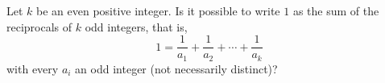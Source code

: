 Let $k$ be an even positive integer. Is it possible to write $1$ as the sum of the reciprocals of $k$ odd integers, that is,
\[1=\dfrac1{a_1}+\dfrac1{a_2}+\cdots+\dfrac1{a_k}\]
with every $a_i$ an odd integer (not necessarily distinct)?
